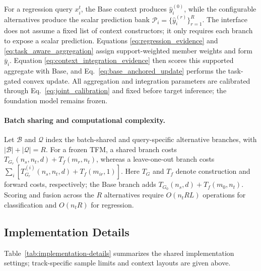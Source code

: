 For a regression query $x_i^t$, the Base context produces
$\hat y_i^{(0)}$, while the configurable alternatives produce the scalar
prediction bank $\mathcal P_i=\{\hat y_i^{(r)}\}_{r=1}^{R}$.
The interface does not assume a fixed list of context constructors; it only
requires each branch to expose a scalar prediction. Equations
\eqref{eq:regression_evidence} and \eqref{eq:task_aware_aggregation} assign
support-weighted member weights and form $\bar y_i$. Equation
\eqref{eq:context_integration_evidence} then scores this supported
aggregate with Base, and Eq.~\eqref{eq:base_anchored_update} performs the
task-gated convex update. All aggregation and integration parameters are
calibrated through Eq.~\eqref{eq:joint_calibration} and fixed before target
inference; the foundation model remains frozen.

\paragraph{Batch sharing and computational complexity.}
Let $\mathcal B$ and $\mathcal Q$ index the batch-shared and query-specific
alternative branches, with $|\mathcal B|+|\mathcal Q|=R$. For a frozen TFM,
a shared branch costs $T_{G_r}(n_s,n_t,d)+T_f(m_r,n_t)$, whereas a leave-one-out
branch costs $\sum_i[T_{G_r}^{(i)}(n_s,n_t,d)+T_f(m_{ir},1)]$. Here $T_G$
and $T_f$ denote construction and forward costs, respectively; the Base branch
adds $T_{G_0}(n_s,d)+T_f(m_0,n_t)$. Scoring and fusion across the $R$
alternatives require $O(n_tRL)$ operations for classification and $O(n_tR)$
for regression.

\subsection{Implementation Details}
\label{app:implementation_details}

Table~\ref{tab:implementation-details} summarizes the shared implementation
settings; track-specific sample limits and context layouts are given above.

